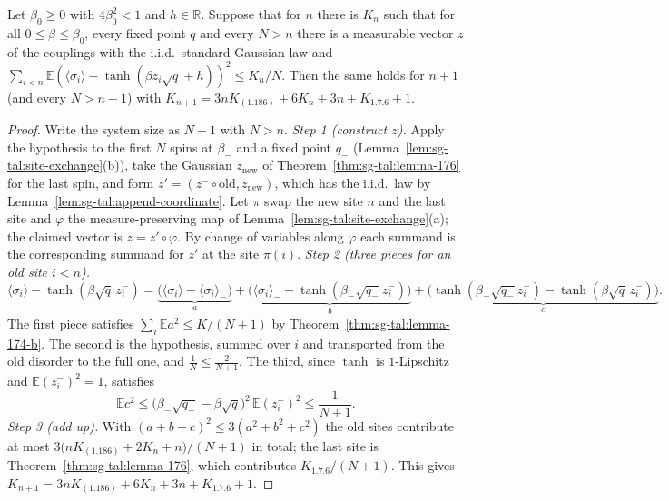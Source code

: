\begin{theorem}
\label{thm:sg-tal:theorem-171-step}
  \leanok
{}
Let $\beta_0\ge0$ with $4\beta_0^2<1$ and $h\in\mathbb R$.  Suppose that for $n$ there is $K_n$ such that for all $0\le\beta\le\beta_0$, every fixed point $q$ and every $N>n$ there is a measurable vector $z$ of the couplings with the i.i.d.\ standard Gaussian law and $\sum_{i<n}\mathbb E(\langle\sigma_i\rangle-\tanh(\beta z_i\sqrt q+h))^2\le K_n/N$.  Then the same holds for $n+1$ (and every $N>n+1$) with $K_{n+1}=3nK_{(1.186)}+6K_n+3n+K_{1.7.6}+1$.
\end{theorem}
\begin{proof}
  \leanok
Write the system size as $N+1$ with $N>n$.
\emph{Step 1 (construct $z$).} Apply the hypothesis to the first $N$ spins at $\beta_-$ and a fixed point $q_-$ (Lemma~\ref{lem:sg-tal:site-exchange}(b)), take the Gaussian $z_{\mathrm{new}}$ of Theorem~\ref{thm:sg-tal:lemma-176} for the last spin, and form $z'=(z^-\circ\mathrm{old},z_{\mathrm{new}})$, which has the i.i.d.\ law by Lemma~\ref{lem:sg-tal:append-coordinate}. Let $\pi$ swap the new site $n$ and the last site and $\varphi$ the measure-preserving map of Lemma~\ref{lem:sg-tal:site-exchange}(a); the claimed vector is $z=z'\circ\varphi$. By change of variables along $\varphi$ each summand is the corresponding summand for $z'$ at the site $\pi(i)$.
\emph{Step 2 (three pieces for an old site $i<n$).}
\[
\langle\sigma_i\rangle-\tanh(\beta\sqrt q\,z^-_i)=\underbrace{\big(\langle\sigma_i\rangle-\langle\sigma_i\rangle_-\big)}_{a}+\underbrace{\big(\langle\sigma_i\rangle_--\tanh(\beta_-\sqrt{q_-}z^-_i)\big)}_{b}+\underbrace{\big(\tanh(\beta_-\sqrt{q_-}z^-_i)-\tanh(\beta\sqrt q\,z^-_i)\big)}_{c}.
\]
The first piece satisfies $\sum_i\mathbb Ea^2\le K/(N+1)$ by Theorem~\ref{thm:sg-tal:lemma-174-b}. The second is the hypothesis, summed over $i$ and transported from the old disorder to the full one, and $\frac1N\le\frac2{N+1}$. The third, since $\tanh$ is $1$-Lipschitz and $\mathbb E(z^-_i)^2=1$, satisfies
\[
\mathbb Ec^2\le\big(\beta_-\sqrt{q_-}-\beta\sqrt q\big)^2\,\mathbb E(z^-_i)^2\le\frac1{N+1}.
\]
\emph{Step 3 (add up).} With $(a+b+c)^2\le3(a^2+b^2+c^2)$ the old sites contribute at most $3\big(nK_{(1.186)}+2K_n+n\big)/(N+1)$ in total; the last site is Theorem~\ref{thm:sg-tal:lemma-176}, which contributes $K_{1.7.6}/(N+1)$. This gives $K_{n+1}=3nK_{(1.186)}+6K_n+3n+K_{1.7.6}+1$.
\end{proof}

